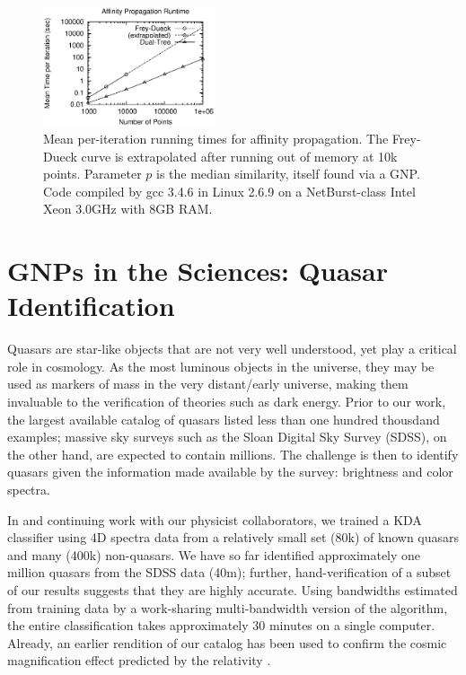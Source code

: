 \documentclass[twoside,leqno,twocolumn]{article}
\begin{document}
\begin{figure}[tb]
  \begin{center}
    \includegraphics[width=0.45\textwidth]{r-speed.ps}
  \end{center}
  \vspace{-10pt}
  \caption{\label{fig:ap-speed}\footnotesize Mean per-iteration
    running times for affinity propagation.  The Frey-Dueck curve is
    extrapolated after running out of memory at 10k points.
    Parameter $p$ is the median similarity, itself found via a GNP.
    Code compiled by gcc 3.4.6 in Linux 2.6.9 on a NetBurst-class
    Intel Xeon 3.0GHz with 8GB RAM.}
\end{figure}

\section{GNPs in the Sciences: Quasar Identification}
Quasars are star-like objects that are not very well understood, yet
play a critical role in cosmology.  As the most luminous objects in
the universe, they may be used as markers of mass in the very
distant/early universe, making them invaluable to the verification of
theories such as dark energy.  Prior to our work, the largest
available catalog of quasars listed less than one hundred thousdand
examples; massive sky surveys such as the Sloan Digital Sky Survey
(SDSS), on the other hand, are expected to contain millions.  The
challenge is then to identify quasars given the information made
available by the survey: brightness and color spectra.

In \cite{richards04} and continuing work with our physicist
collaborators, we trained a KDA classifier using 4D spectra data from
a relatively small set (80k) of known quasars and many (400k)
non-quasars.  We have so far identified approximately one million
quasars from the SDSS data (40m); further, hand-verification of a
subset of our results suggests that they are highly accurate.  Using
bandwidths estimated from training data by a work-sharing
multi-bandwidth version of the algorithm, the entire classification
takes approximately 30 minutes on a single computer.  Already, an
earlier rendition of our catalog has been used to confirm the cosmic
magnification effect predicted by the relativity \cite{nature05}.
\end{document}
